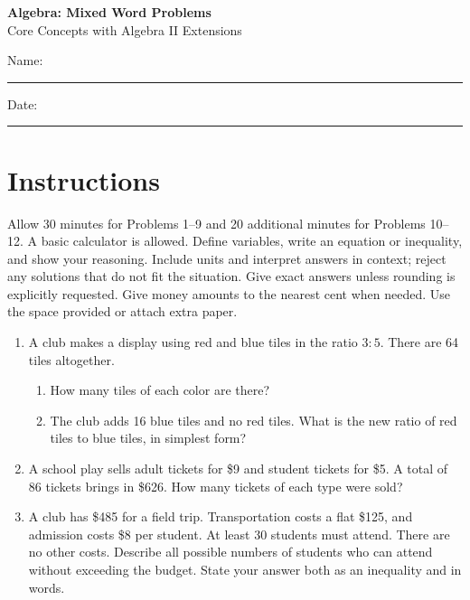 \documentclass[12pt]{article}
\begin{document}
\begin{center}
  {\Large\textbf{Algebra: Mixed Word Problems}}\\[3pt]
  {\large Core Concepts with Algebra II Extensions}
\end{center}

Name: \rule{2.7in}{0.4pt}\hfill Date: \rule{1.5in}{0.4pt}

\section*{Instructions}
Allow 30 minutes for Problems 1--9 and 20 additional minutes for Problems
10--12. A basic calculator is allowed. Define variables, write an equation
or inequality, and show your reasoning. Include units and interpret answers
in context; reject any solutions that do not fit the situation. Give exact
answers unless rounding is explicitly requested. Give money amounts to the
nearest cent when needed. Use the space provided or attach extra paper.

\begin{enumerate}[leftmargin=*,itemsep=0pt]
  \item A club makes a display using red and blue tiles in the ratio $3:5$.
  There are 64 tiles altogether.
  \begin{enumerate}[label=(\alph*),leftmargin=1.6em,itemsep=0.2em]
    \item How many tiles of each color are there?
    \item The club adds 16 blue tiles and no red tiles. What is the new
    ratio of red tiles to blue tiles, in simplest form?
  \end{enumerate}

  \item A school play sells adult tickets for \$9 and student tickets for
  \$5. A total of 86 tickets brings in \$626. How many tickets of each type
  were sold?

  \item A club has \$485 for a field trip. Transportation costs a flat
  \$125, and admission costs \$8 per student. At least 30 students must
  attend. There are no other costs. Describe all possible numbers of
  students who can attend without exceeding the budget. State your answer
  both as an inequality and in words.
\end{enumerate}
\end{document}
